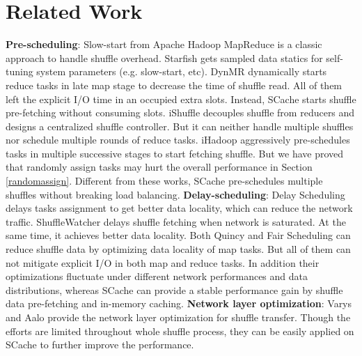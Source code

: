 \section{Related Work}
\textbf{Pre-scheduling}: Slow-start from Apache Hadoop MapReduce \cite{hadoop} is a classic approach to handle shuffle overhead. 
Starfish \cite{starfish} gets sampled data statics for self-tuning system parameters (e.g. slow-start, etc). 
DynMR \cite{dynmr} dynamically starts reduce tasks in late map stage to decrease the time of shuffle read. 
All of them left the explicit I/O time in an occupied extra slots. 
Instead, SCache starts shuffle pre-fetching without consuming slots. 
iShuffle \cite{ishuffle} decouples shuffle from reducers and designs a centralized shuffle controller. 
But it can neither handle multiple shuffles nor schedule multiple rounds of reduce tasks. 
iHadoop \cite{ihadoop} aggressively pre-schedules tasks in multiple successive stages to start fetching shuffle. 
But we have proved that randomly assign tasks may hurt the overall performance in Section \ref{randomassign}. 
Different from these works, SCache pre-schedules multiple shuffles without breaking load balancing. 
\textbf{Delay-scheduling}: Delay Scheduling \cite{delay} delays tasks assignment to get better data locality, which can reduce the network traffic. 
ShuffleWatcher \cite{shufflewatcher} delays shuffle fetching when network is saturated. 
At the same time, it achieves better data locality. 
Both Quincy \cite{quincy} and Fair Scheduling \cite{preemptive} can reduce shuffle data by optimizing data locality of map tasks. 
But all of them can not mitigate explicit I/O in both map and reduce tasks. 
In addition their optimizations fluctuate under different network performances and data distributions, whereas SCache can provide a stable performance gain by shuffle data pre-fetching and in-memory caching.
\textbf{Network layer optimization}: Varys \cite{varys} and Aalo \cite{aalo} provide the network layer optimization for shuffle transfer. 
Though the efforts are limited throughout whole shuffle process, they can be easily applied on SCache to further improve the performance.